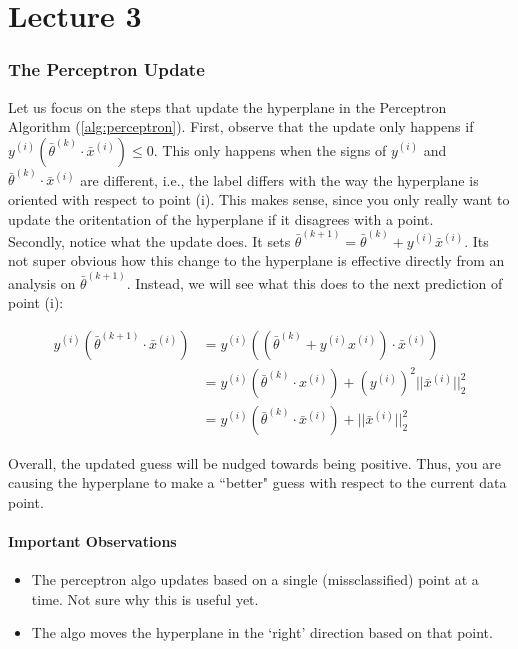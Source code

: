 \documentclass[12pt]{article}
\begin{document}
\part{Lecture 3}

\section{The Perceptron Update}

Let us focus on the steps that update the hyperplane in the Perceptron Algorithm (\ref{alg:perceptron}). First, observe that the update only happens if $y^{(i)}(\bar{\theta}^{(k)} \cdot \bar{x}^{(i)}) \le 0$. This only happens when the signs of $y^{(i)}$ and $\bar{\theta}^{(k)} \cdot \bar{x}^{(i)}$ are different, i.e., the label differs with the way the hyperplane is oriented with respect to point (i). This makes sense, since you only really want to update the oritentation of the hyperplane if it disagrees with a point.\\

Secondly, notice what the update does. It sets $\bar{\theta}^{(k+1)} = \bar{\theta}^{(k)} + y^{(i)}\bar{x}^{(i)}$. Its not super obvious how this change to the hyperplane is effective directly from an analysis on $\bar{\theta}^{(k+1)}$. Instead, we will see what this does to the next prediction of point (i):

\[ 
	\begin{aligned}
		y^{(i)}(\bar{\theta}^{(k+1)} \cdot \bar{x}^{(i)}) &= y^{(i)}((\bar{\theta}^{(k)} + y^{(i)}x^{(i)}) \cdot \bar{x}^{(i)})\\
																											&= y^{(i)}(\bar{\theta}^{(k)} \cdot x^{(i)}) + (y^{(i)})^2||\bar{x}^{(i)}||_2^2\\
																											&= y^{(i)}(\bar{\theta}^{(k)} \cdot \bar{x}^{(i)}) + ||\bar{x}^{(i)}||_2^2
	\end{aligned}
\]

Overall, the updated guess will be nudged towards being positive. Thus, you are causing the hyperplane to make a ``better" guess with respect to the current data point.

\subsection{Important Observations}

\begin{itemize}
	\item The perceptron algo updates based on a single (missclassified) point at a time. Not sure why this is useful yet.
	\item The algo moves the hyperplane in the `right' direction based on that point.
\end{itemize}
\end{document}
